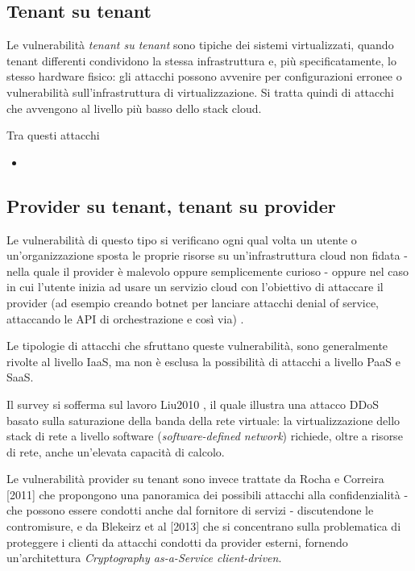 \documentclass[../main.tex]{subfiles}
\begin{document}
\subsection{Tenant su tenant}
Le vulnerabilità \textit{tenant su tenant} sono tipiche dei sistemi virtualizzati, quando tenant differenti condividono la stessa infrastruttura e, più specificatamente, lo stesso hardware fisico: gli attacchi possono avvenire per configurazioni erronee o vulnerabilità sull'infrastruttura di virtualizzazione. Si tratta quindi di attacchi che avvengono al livello più basso dello stack cloud\cite{Ardagna:2015:SAC:2808687.2767005}.

Tra questi attacchi 

\begin{itemize}
    \item 
\end{itemize}
\subsection{Provider su tenant, tenant su provider}
Le vulnerabilità di questo tipo si verificano ogni qual volta un utente o un'organizzazione sposta le proprie risorse su un'infrastruttura cloud non fidata - nella quale il provider è malevolo oppure semplicemente curioso - oppure nel caso in cui l'utente inizia ad usare un servizio cloud con l'obiettivo di attaccare il provider (ad esempio creando botnet per lanciare attacchi denial of service, attaccando le API di orchestrazione e così via) \cite{Ardagna:2015:SAC:2808687.2767005}.


Le tipologie di attacchi che sfruttano queste vulnerabilità, sono generalmente rivolte al livello IaaS\cite{Ardagna:2015:SAC:2808687.2767005}, ma non è esclusa la possibilità di attacchi a livello PaaS e SaaS.

Il survey si sofferma sul lavoro Liu2010 %
, il quale illustra una attacco DDoS basato sulla saturazione della banda della rete virtuale: la virtualizzazione dello stack di rete a livello software (\textit{software-defined network}) richiede, oltre a risorse di rete, anche un'elevata capacità di calcolo.


Le vulnerabilità provider su tenant sono invece trattate da Rocha e Correira [2011] %
che propongono una panoramica dei possibili attacchi alla confidenzialità - che possono essere condotti anche dal fornitore di servizi - discutendone le contromisure, e da Blekeirz et al [2013] che si concentrano sulla problematica di proteggere i clienti da attacchi condotti da provider esterni, fornendo un'architettura \textit{Cryptography as-a-Service client-driven}.
\end{document}
